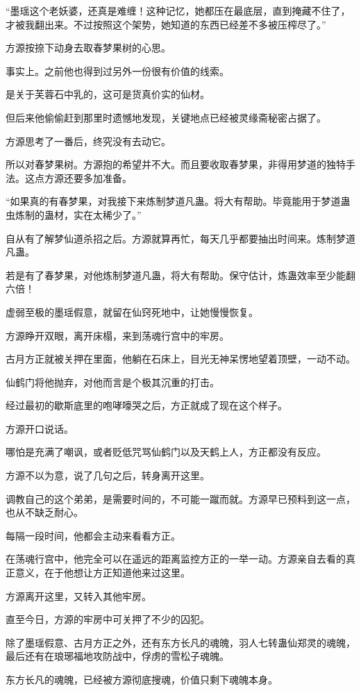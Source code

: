 \begin{this_body}
“墨瑶这个老妖婆，还真是难缠！这种记忆，她都压在最底层，直到掩藏不住了，才被我翻出来。不过按照这个架势，她知道的东西已经差不多被压榨尽了。”

方源按捺下动身去取春梦果树的心思。

事实上。之前他也得到过另外一份很有价值的线索。

是关于芙蓉石中乳的，这可是货真价实的仙材。

但后来他偷偷赶到那里时遗憾地发现，关键地点已经被灵缘斋秘密占据了。

方源思考了一番后，终究没有去动它。

所以对春梦果树。方源抱的希望并不大。而且要收取春梦果，非得用梦道的独特手法。这点方源还要多加准备。

“如果真的有春梦果，对我接下来炼制梦道凡蛊。将大有帮助。毕竟能用于梦道蛊虫炼制的蛊材，实在太稀少了。”

自从有了解梦仙道杀招之后。方源就算再忙，每天几乎都要抽出时间来。炼制梦道凡蛊。

若是有了春梦果，对他炼制梦道凡蛊，将大有帮助。保守估计，炼蛊效率至少能翻六倍！

虚弱至极的墨瑶假意，就留在仙窍死地中，让她慢慢恢复。

方源睁开双眼，离开床榻，来到荡魂行宫中的牢房。

古月方正就被关押在里面，他躺在石床上，目光无神呆愣地望着顶壁，一动不动。

仙鹤门将他抛弃，对他而言是个极其沉重的打击。

经过最初的歇斯底里的咆哮嚎哭之后，方正就成了现在这个样子。

方源开口说话。

哪怕是充满了嘲讽，或者贬低咒骂仙鹤门以及天鹤上人，方正都没有反应。

方源不以为意，说了几句之后，转身离开这里。

调教自己的这个弟弟，是需要时间的，不可能一蹴而就。方源早已预料到这一点，也从不缺乏耐心。

每隔一段时间，他都会主动来看看方正。

在荡魂行宫中，他完全可以在遥远的距离监控方正的一举一动。方源亲自去看的真正意义，在于他想让方正知道他来过这里。

方源离开这里，又转入其他牢房。

直至今日，方源的牢房中可关押了不少的囚犯。

除了墨瑶假意、古月方正之外，还有东方长凡的魂魄，羽人七转蛊仙郑灵的魂魄，最后还有在琅琊福地攻防战中，俘虏的雪松子魂魄。

东方长凡的魂魄，已经被方源彻底搜魂，价值只剩下魂魄本身。


\end{this_body}
